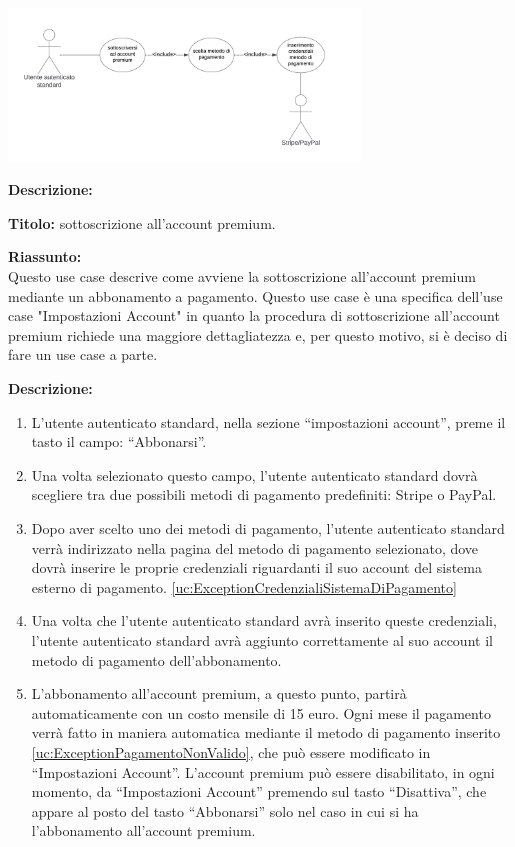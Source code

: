 \begin{listaPersonale}[UC]{}
\begin{listaPersonale2}[UC] {}
        \begin{center}
            \includegraphics[width=0.7\textwidth]{img/Diagrammi/UseCases/UtentePremium.png}
        \end{center}

        \textbf{Descrizione:}

        \textbf{Titolo:} sottoscrizione all'account premium.

        \textbf{Riassunto:} \\
        Questo use case descrive come avviene la sottoscrizione all'account premium mediante un abbonamento a pagamento.
        Questo use case è una specifica dell'use case "Impostazioni Account" in quanto la procedura di sottoscrizione all'account premium richiede una maggiore dettagliatezza e, per questo motivo, si è deciso di fare un use case a parte.

        \textbf{Descrizione:}
        \begin{enumerate}
            \item L'utente autenticato standard, nella sezione “impostazioni account”, preme il tasto il campo: “Abbonarsi”.
            \item Una volta selezionato questo campo, l'utente autenticato standard dovrà scegliere tra due possibili metodi di pagamento predefiniti: Stripe o PayPal.
            \item Dopo aver scelto uno dei metodi di pagamento, l'utente autenticato standard verrà indirizzato nella pagina del metodo di pagamento selezionato, dove dovrà inserire le proprie credenziali riguardanti il suo account del sistema esterno di pagamento. \ref{uc:ExceptionCredenzialiSistemaDiPagamento}
            \item Una volta che l'utente autenticato standard avrà inserito queste credenziali, l'utente autenticato standard avrà aggiunto correttamente al suo account il metodo di pagamento dell'abbonamento.
            \item L'abbonamento all'account premium, a questo punto, partirà automaticamente con un costo mensile di 15 euro. Ogni mese il pagamento verrà fatto in maniera automatica mediante il metodo di pagamento inserito \ref{uc:ExceptionPagamentoNonValido}, che può essere modificato in “Impostazioni Account”. L'account premium può essere disabilitato, in ogni momento, da “Impostazioni Account” premendo sul tasto “Disattiva”, che appare al posto del tasto “Abbonarsi” solo nel caso in cui si ha l'abbonamento all'account premium.
        \end{enumerate}


\end{listaPersonale2}
\end{listaPersonale}
